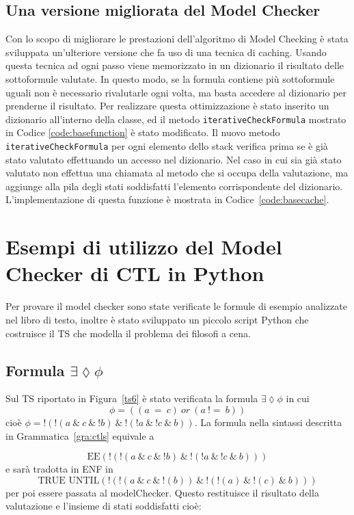 \documentclass[a4paper, 10pt]{article}
\numberwithin{equation}{theor}
\begin{document}
\subsection{Una versione migliorata del Model Checker}
Con lo scopo di migliorare le prestazioni dell'algoritmo di Model Checking è stata sviluppata un'ulteriore versione che fa uso di una tecnica di caching. Usando questa tecnica ad ogni passo viene memorizzato in un dizionario il risultato delle sottoformule valutate. In questo modo, se la formula contiene più sottoformule uguali non è necessario rivalutarle ogni volta, ma basta accedere al dizionario per prenderne il risultato.
Per realizzare questa ottimizzazione è stato inserito un dizionario all'interno della classe, ed il metodo \texttt{iterativeCheckFormula} mostrato in Codice \ref{code:basefunction} è stato modificato. Il nuovo metodo \texttt{iterativeCheckFormula} per ogni elemento dello stack verifica prima se è già stato valutato effettuando un accesso nel dizionario. Nel caso in cui sia già stato valutato non effettua una chiamata al metodo che si occupa della valutazione, ma aggiunge alla pila degli stati soddisfatti l'elemento corrispondente del dizionario. L'implementazione di questa funzione è mostrata in Codice~\ref{code:basecache}.


\section{Esempi di utilizzo del Model Checker di \ac{CTL} in Python}
Per provare il model checker sono state verificate le formule di esempio analizzate nel libro di testo, inoltre è stato sviluppato un piccolo script Python
che costruisce il \ac{TS} che modella il problema dei filosofi a cena.
\subsection{Formula $ \exists \lozenge  \phi$}
Sul \ac{TS} riportato in Figura~\ref{ts6} è stato verificata la formula $ \exists \lozenge  \phi$ in cui
$$ \phi = ((a\ =\ c)\ or\ (a\ !=\ b))$$
cioè  $\phi = !(!(a \ \& \ c \ \& \ !b) \ \& \ !(!a \ \& \ !c \ \& \ b))$.
La formula nella sintassi descritta in Grammatica~\ref{gra:ctls} equivale a

$$ \text{EE} (!(!( a\ \&\ c\ \&\ !b)\ \&\ !( !a\ \&\ !c\ \&\ b)))$$
 e sarà tradotta in \ac{ENF} in \\
$$\text{TRUE UNTIL} (!(!(a\ \&\ c\ \&\ !(b))\ \&\ !(!(a)\ \&\ !(c)\ \&\ b)))$$
 per poi essere passata al modelChecker. Questo restituisce il risultato della valutazione e l'insieme di stati soddisfatti cioè:
\end{document}
